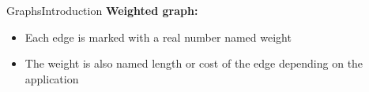
\begin{frame}{Graphs}{Introduction}
  \textbf{Weighted graph:}
  \begin{figure}
    \begin{adjustbox}{width=0.75\linewidth}
      
    \end{adjustbox}
    \label{fig:graphs:introduction_weighted}
  \end{figure}
  \begin{itemize}
    \item<3->
      Each edge is marked with a real number named {\color{MainA}weight}
    \item<4->
      The {\color{MainA}weight} is also named {\color{MainA}length}
      or {\color{MainA}cost} of the edge depending on the application
  \end{itemize}
\end{frame}


